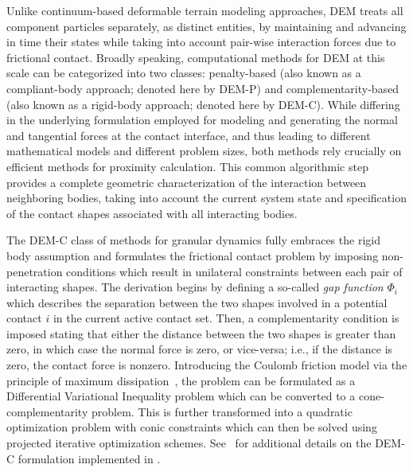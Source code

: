 \documentclass[12pt,twocolumn]{article}
\newcommand{\CHRONO}{{\sffamily{{Chrono}}}}
\begin{document}
Unlike continuum-based deformable terrain modeling approaches, DEM treats all component particles separately, as distinct entities, by maintaining and advancing in time their states while taking into account pair-wise interaction forces due to frictional contact.
%
Broadly speaking, computational methods for DEM at this scale can be categorized into two classes: penalty-based (also known as a compliant-body approach; denoted here by DEM-P) and complementarity-based (also known as a rigid-body approach; denoted here by DEM-C).  While differing in the underlying formulation employed for modeling and generating the normal and tangential forces at the contact interface, and thus leading to different mathematical models and different problem sizes, both methods rely crucially on efficient methods for proximity calculation. This common algorithmic step provides a complete geometric characterization of the interaction between neighboring bodies, taking into account the current system state and specification of the contact shapes associated with all interacting bodies.

The DEM-C class of methods for granular dynamics fully embraces the rigid body assumption and formulates the frictional contact problem by imposing non-penetration conditions which result in unilateral constraints between each pair of interacting shapes.  The derivation begins by defining a so-called {\em gap function} $\Phi_i$ which describes the separation between the two shapes involved in a potential contact $i$ in the current active contact set. Then, a complementarity condition is imposed stating that either the distance between the two shapes is greater than zero, in which case the normal force is zero, or vice-versa; i.e., if the distance is zero, the contact force is nonzero.  Introducing the Coulomb friction model via the principle of maximum dissipation~\cite{moreau2011unilateral}, the problem can be formulated as a Differential Variational Inequality problem which can be converted to a cone-complementarity problem.  This is further transformed into a quadratic optimization problem with conic constraints which can then be solved using projected iterative optimization schemes.
%
See~\cite{DVI_TR} for additional details on the DEM-C formulation implemented in {\CHRONO}.
\end{document}

